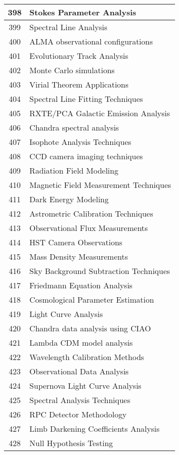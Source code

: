 \begin{table}[htbp]
\begin{tabular}{|c|l|}
\hline
398 & Stokes Parameter Analysis \\
\hline
399 & Spectral Line Analysis \\
\hline
400 & ALMA observational configurations \\
\hline
401 & Evolutionary Track Analysis \\
\hline
402 & Monte Carlo simulations \\
\hline
403 & Virial Theorem Applications \\
\hline
404 & Spectral Line Fitting Techniques \\
\hline
405 & RXTE/PCA Galactic Emission Analysis \\
\hline
406 & Chandra spectral analysis \\
\hline
407 & Isophote Analysis Techniques \\
\hline
408 & CCD camera imaging techniques \\
\hline
409 & Radiation Field Modeling \\
\hline
410 & Magnetic Field Measurement Techniques \\
\hline
411 & Dark Energy Modeling \\
\hline
412 & Astrometric Calibration Techniques \\
\hline
413 & Observational Flux Measurements \\
\hline
414 & HST Camera Observations \\
\hline
415 & Mass Density Measurements \\
\hline
416 & Sky Background Subtraction Techniques \\
\hline
417 & Friedmann Equation Analysis \\
\hline
418 & Cosmological Parameter Estimation \\
\hline
419 & Light Curve Analysis \\
\hline
420 & Chandra data analysis using CIAO \\
\hline
421 & Lambda CDM model analysis \\
\hline
422 & Wavelength Calibration Methods \\
\hline
423 & Observational Data Analysis \\
\hline
424 & Supernova Light Curve Analysis \\
\hline
425 & Spectral Analysis Techniques \\
\hline
426 & RPC Detector Methodology \\
\hline
427 & Limb Darkening Coefficients Analysis \\
\hline
428 & Null Hypothesis Testing \\

\end{tabular}
\end{table}
